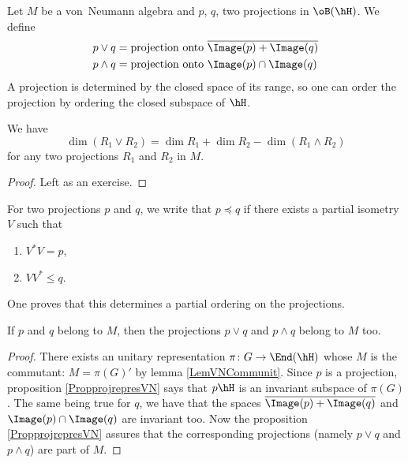 Let $M$ be a von~Neumann algebra and $p$, $q$, two projections in $\oB(\hH)$. We define
\begin{align}
p\vee q		&=\text{projection onto $\overline{ \Image(p)+\Image(q) }$}\\
p\wedge q	&=\text{projection onto $\Image(p)\cap\Image(q)$}
\end{align}
A projection is determined by the closed space of its range, so one can order the projection by ordering the closed subspace of $\hH$.

\begin{lemma}		\label{LemDimSupDeuxProjs}
We have
\begin{equation}
	\dim(R_1\vee R_2)=\dim R_1+\dim R_2-\dim(R_1\wedge R_2)
\end{equation}
for any two projections $R_1$ and $R_2$ in $M$.
\end{lemma}

\begin{proof}
Left as an exercise. 
\end{proof}

For two projections $p$ and $q$, we write that $p\preceq q$ if there exists a partial isometry $V$ such that
\begin{enumerate}
\item $V^*V=p$,
\item $VV^*\leq q$.
\end{enumerate}
One proves that this determines a partial ordering on the projections.

\begin{proposition}
If $p$ and $q$ belong to $M$, then the projections $p\vee q$ and $p\wedge q$ belong to $M$ too.
\end{proposition}

\begin{proof}
There exists an unitary representation $\pi\colon G\to \End(\hH)$ whose $M$ is the commutant: $M=\pi(G)'$ by lemma \ref{LemVNCommunit}. Since $p$ is a projection, proposition \ref{PropprojrepresVN} says that $p\hH$ is an invariant subspace of $\pi(G)$. The same being true for $q$, we have that the spaces $\overline{ \Image(p)+\Image(q) }$ and $\Image(p)\cap\Image(q)$ are invariant too. Now the proposition \ref{PropprojrepresVN} assures that the corresponding projections (namely $p\vee q$ and $p\wedge q$) are part of $M$.
\end{proof}

